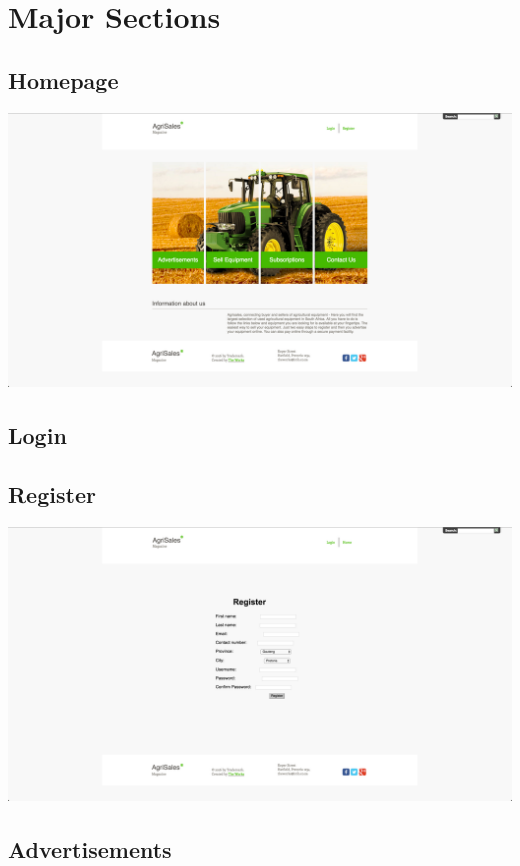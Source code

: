 \documentclass[11pt]{article}
\begin{document}


\tableofcontents

\newpage

\section{Major Sections}
	\subsection{Homepage}
		\includegraphics[width=\textwidth]{../Images/Homepage}
	\subsection{Login}
	\subsection{Register}
		\includegraphics[width=\textwidth]{../Images/Register}
	\subsection{Advertisements}
\end{document}
